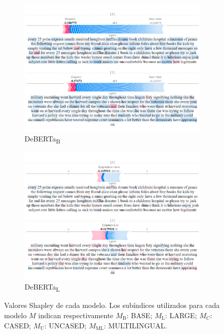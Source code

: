 \begin{figure}[!h]

    \begin{subfigure}[t]{0.4\textwidth}
        \includegraphics[width=\textwidth]{figs/one_TF/deberta-b.png}
        \caption{{DeBERTa}\textsubscript{B}}
    \end{subfigure}
    \hspace{\fill} %
    \begin{subfigure}[t]{0.4\textwidth}
        \includegraphics[width=\linewidth]{figs/one_TF/deberta-l.png}
        \caption{{DeBERTa}\textsubscript{L}}
    \end{subfigure}    
    
    \caption{Valores Shapley de cada modelo. Los subíndices utilizados para cada modelo $M$ indican respectivamente $M_{\text{B}}$: BASE; $M_{\text{L}}$: LARGE; $M_{C}$: CASED; $M_{\text{U}}$: UNCASED; $M_{\text{ML}}$: MULTILINGUAL.}
\end{figure}



